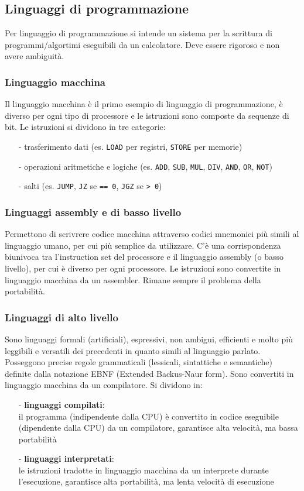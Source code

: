\documentclass{article}
\begin{document}
\subsection{Linguaggi di programmazione}
Per linguaggio di programmazione si intende un sistema per la scrittura di programmi/algortimi eseguibili da un calcolatore.
Deve essere rigoroso e non avere ambiguità.

\subsubsection*{Linguaggio macchina}
Il linguaggio macchina è il primo esempio di linguaggio di programmazione, è diverso per ogni tipo di processore e le
istruzioni sono composte da sequenze di bit. Le istruzioni si dividono in tre categorie:
\begin{itemize}[topsep=3pt, itemsep=0pt]
	\item[-] trasferimento dati (es. \verb|LOAD| per registri, \verb|STORE| per memorie)
	\item[-] operazioni aritmetiche e logiche (es. \verb|ADD|, \verb|SUB|, \verb|MUL|, \verb|DIV|, \verb|AND|, \verb|OR|, \verb|NOT|)
	\item[-] salti (es. \verb|JUMP|, \verb|JZ| se \verb|== 0|, \verb|JGZ| se \verb|> 0|)
\end{itemize}

\subsubsection*{Linguaggi assembly e di basso livello}
Permettono di scrivrere codice macchina attraverso codici mnemonici più simili al linguaggio umano, per cui più semplice
da utilizzare. C'è una corrispondenza biunivoca tra l'instruction set del processore e il linguaggio assembly (o basso
livello), per cui è diverso per ogni processore. Le istruzioni sono convertite in linguaggio macchina da un assembler.
Rimane sempre il problema della portabilità.

\subsubsection*{Linguaggi di alto livello}
Sono linguaggi formali (artificiali), espressivi, non ambigui, efficienti e molto più leggibili e versatili dei precedenti
in quanto simili al linguaggio parlato. Posseggono precise regole grammaticali (lessicali, sintattiche e semantiche) definite
dalla notazione EBNF (Extended Backus-Naur form). Sono convertiti in linguaggio macchina da un compilatore. Si dividono in:
\begin{itemize}[topsep=3pt, itemsep=0pt]
	\item[-] \textbf{linguaggi compilati}: \\
	il programma (indipendente dalla CPU) è convertito in codice eseguibile (dipendente dalla CPU) da un compilatore,
	garantisce alta velocità, ma bassa portabilità
	\item[-] \textbf{linguaggi interpretati}: \\
	le istruzioni tradotte in linguaggio macchina da un interprete durante l'esecuzione, garantisce alta portabilità,
	ma lenta velocità di esecuzione
\end{itemize}
\end{document}
